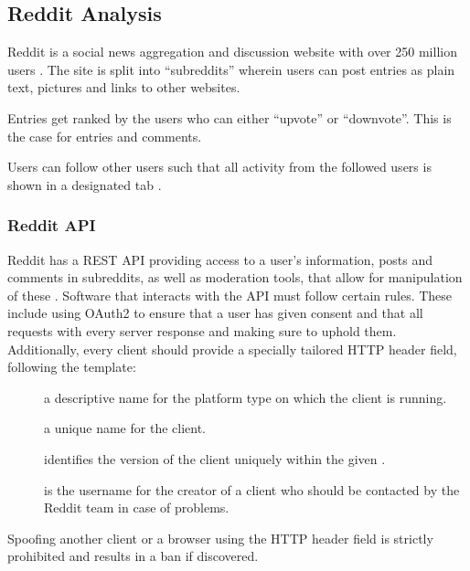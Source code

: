 \subsection{Reddit Analysis}\label{sec:reddit-analysis}
Reddit is a social news aggregation and discussion website with over 250 million
users \citep{AdvertiseOnReddit}. The site is split into ``subreddits'' wherein
users can post entries as plain text, pictures and links to other websites. \nl

Entries get ranked by the users who can either ``upvote'' or ``downvote''. This
is the case for entries and comments. \citep{AboutReddit}\nl

Users can follow other users such that all activity from the followed users is
shown in a designated tab .

\subsubsection{Reddit API}\label{subsec:reddit-api}
Reddit has a \ac{REST} \ac{API} providing access to a user's information, posts
and comments in subreddits, as well as moderation tools, that allow for
manipulation of these \citep{RedditApi}. Software that interacts with the
\ac{API} must follow certain rules. These include using OAuth2 to ensure that a
user has given consent and that all requests  with every server response and making sure to uphold them.
Additionally, every client should provide a specially tailored 
\ac{HTTP} header field, following the template: \citep{RedditApiRules}\nl

\begin{center}
\end{center}\nl
\begin{description}
  \item[] a descriptive name for the platform type on which the
  client is running.
  \item[] a unique name for the client.
  \item[] identifies the version of the client uniquely
  within the given .
  \item[] is the username for the creator of a client who
  should be contacted by the Reddit team in case of problems.
\end{description}\nl

Spoofing another client or a browser using the  \ac{HTTP} header
field is strictly prohibited and results in a ban if discovered.
\citep{RedditApiRules}\nl

